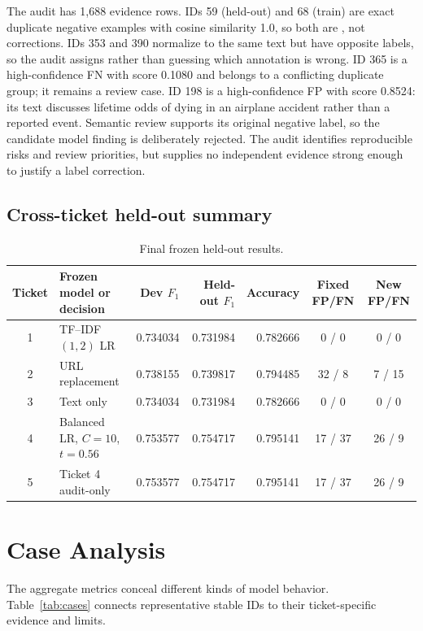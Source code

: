 \documentclass[10pt]{article}
\newcommand{\code}[1]{\texttt{\detokenize{#1}}}
\newcommand{\fscore}{\ensuremath{F_1}}
\begin{document}
The audit has 1,688 evidence rows. IDs 59 (held-out) and 68 (train) are exact duplicate negative examples with cosine similarity 1.0, so both are \code{keep_but_flag}, not corrections. IDs 353 and 390 normalize to the same text but have opposite labels, so the audit assigns \code{ambiguous} rather than guessing which annotation is wrong. ID 365 is a high-confidence FN with score 0.1080 and belongs to a conflicting duplicate group; it remains a review case. ID 198 is a high-confidence FP with score 0.8524: its text discusses lifetime odds of dying in an airplane accident rather than a reported event. Semantic review supports its original negative label, so the candidate model finding is deliberately rejected. The audit identifies reproducible risks and review priorities, but supplies no independent evidence strong enough to justify a label correction.

\subsection{Cross-ticket held-out summary}

\begin{table}[htbp]
\centering
\small
\begin{tabular}{c l r r r c c}
\toprule
Ticket & Frozen model or decision & Dev \fscore{} & Held-out \fscore{} & Accuracy & Fixed FP/FN & New FP/FN \\
\midrule
1 & TF--IDF $(1,2)$ LR & 0.734034 & 0.731984 & 0.782666 & 0 / 0 & 0 / 0 \\
2 & URL replacement & 0.738155 & 0.739817 & 0.794485 & 32 / 8 & 7 / 15 \\
3 & Text only & 0.734034 & 0.731984 & 0.782666 & 0 / 0 & 0 / 0 \\
4 & Balanced LR, $C=10$, $t=0.56$ & 0.753577 & 0.754717 & 0.795141 & 17 / 37 & 26 / 9 \\
5 & Ticket 4 audit-only & 0.753577 & 0.754717 & 0.795141 & 17 / 37 & 26 / 9 \\
\bottomrule
\end{tabular}
\caption{Final frozen held-out results.}
\label{tab:cross-ticket}
\end{table}

\section{Case Analysis}

The aggregate metrics conceal different kinds of model behavior. Table~\ref{tab:cases} connects representative stable IDs to their ticket-specific evidence and limits.
\end{document}
